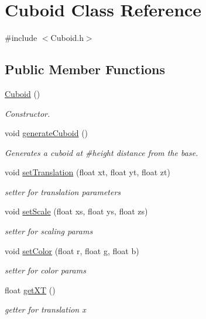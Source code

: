 \hypertarget{classCuboid}{\section{\-Cuboid \-Class \-Reference}
\label{classCuboid}
}


{\ttfamily \#include $<$\-Cuboid.\-h$>$}

\subsection*{\-Public \-Member \-Functions}
\begin{DoxyCompactItemize}
\item 
\hyperlink{classCuboid_a1abf60e93d024b7a01ee5b1a48f1f08a}{\-Cuboid} ()
\begin{DoxyCompactList}\small\item\em \-Constructor. \end{DoxyCompactList}\item 
void \hyperlink{classCuboid_a1930b8d1a439aae490d8950de58d37bd}{generate\-Cuboid} ()
\begin{DoxyCompactList}\small\item\em \-Generates a cuboid at \#height distance from the base. \end{DoxyCompactList}\item 
void \hyperlink{classCuboid_a7179d060567b9d5222e1ff6b588cbf24}{set\-Translation} (float xt, float yt, float zt)
\begin{DoxyCompactList}\small\item\em setter for translation parameters \end{DoxyCompactList}\item 
void \hyperlink{classCuboid_a8a13011bf037acb637798878d111fd5b}{set\-Scale} (float xs, float ys, float zs)
\begin{DoxyCompactList}\small\item\em setter for scaling params \end{DoxyCompactList}\item 
void \hyperlink{classCuboid_ab84c4e6d6deb7ff79bf991f1e29b983a}{set\-Color} (float r, float g, float b)
\begin{DoxyCompactList}\small\item\em setter for color params \end{DoxyCompactList}\item 
float \hyperlink{classCuboid_a32e64e679c9ed3ed4d39c17d3fba42eb}{get\-X\-T} ()
\begin{DoxyCompactList}\small\item\em getter for translation x \end{DoxyCompactList}\item 

\end{DoxyCompactItemize}

